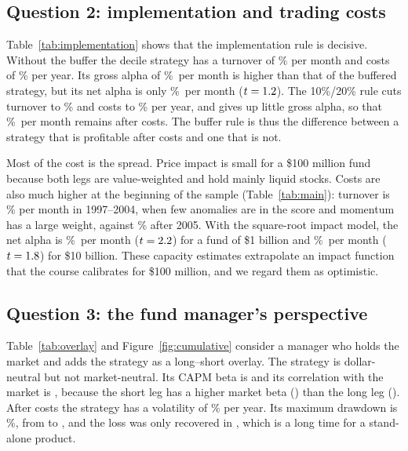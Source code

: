 \documentclass[12pt,a4paper]{article}
\newcommand{\pmo}{\%~per month}
\begin{document}
\subsection{Question 2: implementation and trading costs}
Table~\ref{tab:implementation} shows that the implementation rule is decisive. Without the buffer the decile strategy has a turnover of \baseturn\% per month and costs of \basecost\% per year. Its gross alpha of \basegross\pmo{} is higher than that of the buffered strategy, but its net alpha is only \basenet\pmo{} ($t=1.2$). The 10\%/20\% rule cuts turnover to \turnfull\% and costs to \costfull\% per year, and gives up little gross alpha, so that \netfulla\pmo{} remains after costs. The buffer rule is thus the difference between a strategy that is profitable after costs and one that is not.

Most of the cost is the spread. Price impact is small for a \$100 million fund because both legs are value-weighted and hold mainly liquid stocks. Costs are also much higher at the beginning of the sample (Table~\ref{tab:main}): turnover is \turnearly\% per month in 1997--2004, when few anomalies are in the score and momentum has a large weight, against \turnlate\% after 2005. With the square-root impact model, the net alpha is \robonebn\pmo{} ($t=2.2$) for a fund of \$1 billion and \robtenbn\pmo{} ($t=1.8$) for \$10 billion. These capacity estimates extrapolate an impact function that the course calibrates for \$100 million, and we regard them as optimistic.

\subsection{Question 3: the fund manager's perspective}
Table~\ref{tab:overlay} and Figure~\ref{fig:cumulative} consider a manager who holds the market and adds the strategy as a long--short overlay. The strategy is dollar-neutral but not market-neutral. Its CAPM beta is \capmbeta{} and its correlation with the market is \corrmkt, because the short leg has a higher market beta (\betashort) than the long leg (\betalong). After costs the strategy has a volatility of \vol\% per year. Its maximum drawdown is \maxdd\%, from \ddstart{} to \ddtrough, and the loss was only recovered in \ddrec, which is a long time for a stand-alone product.
\end{document}
